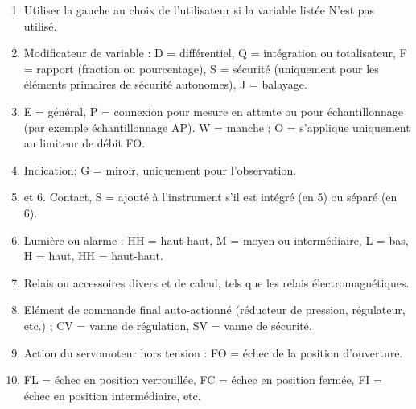 \begin{enumerate}
\item 	Utiliser la gauche au choix de l'utilisateur si la variable listée N'est pas utilisé.
\item 	Modificateur de variable : D = différentiel, Q = intégration ou totalisateur, F = rapport (fraction ou pourcentage), 
S = sécurité (uniquement pour les éléments primaires de sécurité autonomes), J = balayage.
\item 	E = général, P = connexion pour mesure en attente ou pour échantillonnage (par exemple échantillonnage AP). 
W = manche ; O = s'applique uniquement au limiteur de débit FO.
\item 	Indication; G = miroir, uniquement pour l'observation.
\item 	et 6. Contact, S = ajouté à l'instrument s'il est intégré (en 5) ou séparé (en 6).
\item 	Lumière ou alarme : HH = haut-haut, M = moyen ou intermédiaire, L = bas, H = haut, HH = haut-haut.
\item 	Relais ou accessoires divers et de calcul, tels que les relais électromagnétiques.
\item 	Elément de commande final auto-actionné (réducteur de pression, régulateur, etc.) ; CV = vanne de régulation, 
SV = vanne de sécurité.
\item 	Action du servomoteur hors tension : FO = échec de la position d'ouverture.
\item 	FL = échec en position verrouillée, FC = échec en position fermée, FI = échec en position intermédiaire, etc.
\end{enumerate}

